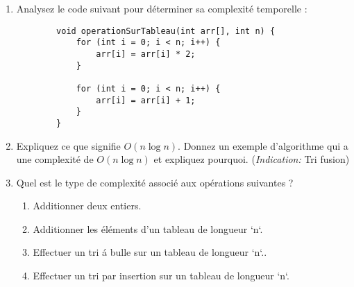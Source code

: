 \begin{enumerate}
	\item Analysez le code suivant pour déterminer sa complexité temporelle :
	\begin{lstlisting}
		void operationSurTableau(int arr[], int n) {
			for (int i = 0; i < n; i++) {
				arr[i] = arr[i] * 2;
			}
			
			for (int i = 0; i < n; i++) {
				arr[i] = arr[i] + 1;
			}
		}
	\end{lstlisting}
	
	\item Expliquez ce que signifie $O(n \log n)$. Donnez un exemple d'algorithme qui a une complexité de $O(n \log n)$ et expliquez pourquoi. (\textit{Indication:} Tri fusion)
	
	\item Quel est le type de complexité associé aux opérations suivantes ?
	\begin{enumerate}
		\item Additionner deux entiers.
		\item Additionner les éléments d'un tableau de longueur `n`.
		\item Effectuer un tri \'a bulle sur un tableau de longueur `n`..
		\item Effectuer un tri par insertion sur un tableau de longueur `n`.
	\end{enumerate}
\end{enumerate}

